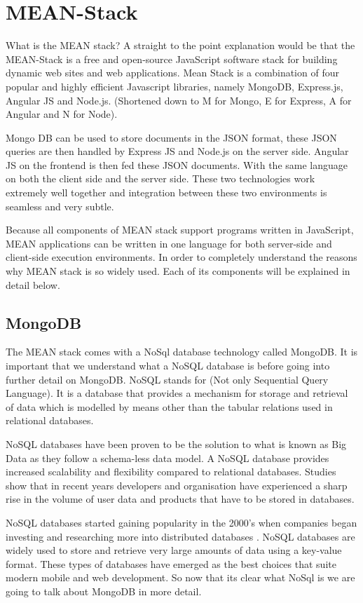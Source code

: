 \section{MEAN-Stack}
What is the MEAN stack? A straight to the point explanation would be that the MEAN-Stack is a free and open-source JavaScript software stack for building dynamic web sites and web applications. Mean Stack is a combination of four popular and highly efficient Javascript libraries, namely MongoDB, Express.js, Angular JS and Node.js. (Shortened down to M for Mongo, E for Express, A for Angular and N for Node). 

Mongo DB can be used to store documents in the JSON format, these JSON queries are then handled by Express JS and Node.js on the server side. Angular JS on the frontend is then fed these JSON documents. With the same language on both the client side and the server side. These two technologies work extremely well together and integration between these two environments is seamless and very subtle.\cite{Mean-Stack}

Because all components of MEAN stack support programs written in JavaScript, MEAN applications can be written in one language for both server-side and client-side execution environments. In order to completely understand the reasons why MEAN stack is so widely used. Each of its components will be explained in detail below. 



\subsection{MongoDB}
The MEAN stack comes with a NoSql database technology called MongoDB.
It is important that we understand what a NoSQL database is before going into further detail on MongoDB. NoSQL stands for (Not only Sequential Query Language). It is a database that provides a mechanism for storage and retrieval of data which is modelled by means other than the tabular relations used in relational databases. 

NoSQL databases have been proven to be the solution to what is
known as Big Data as they follow a schema-less data model. A NoSQL database provides increased scalability and flexibility compared to relational databases. Studies show that in recent years developers and organisation have experienced a sharp rise in the volume of user data and products that have to be stored in databases. 

NoSQL databases started gaining popularity in the 2000’s when companies began investing and researching more into distributed databases \cite{no}.
NoSQL databases are widely used to store and retrieve very large amounts
of data using a key-value format. These types of databases have emerged
as the best choices that suite modern mobile and web development. So now that its clear what NoSql is we are going to talk about MongoDB in more detail.

